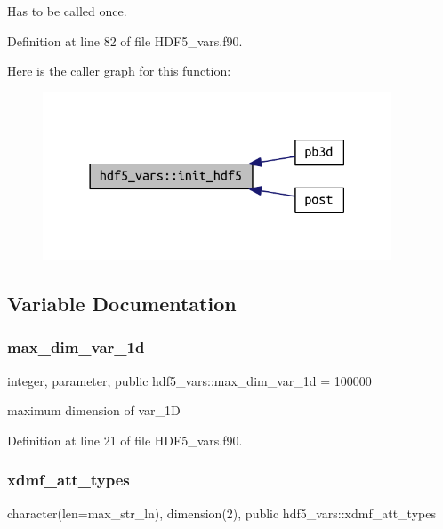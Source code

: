 Has to be called once. 

Definition at line 82 of file H\+D\+F5\+\_\+vars.\+f90.

Here is the caller graph for this function\+:\nopagebreak
\begin{figure}[H]
\begin{center}
\leavevmode
\includegraphics[width=294pt]{namespacehdf5__vars_ab644703bcb67ce423732e39ab56a4b63_icgraph}
\end{center}
\end{figure}


\subsection{Variable Documentation}
\mbox{\label{namespacehdf5__vars_a69c36b36ad7f55ff124ebc328d18adb7}} 
\subsubsection{\texorpdfstring{max\+\_\+dim\+\_\+var\+\_\+1d}{max\_dim\_var\_1d}}
{\footnotesize\ttfamily integer, parameter, public hdf5\+\_\+vars\+::max\+\_\+dim\+\_\+var\+\_\+1d = 100000}



maximum dimension of var\+\_\+1D 



Definition at line 21 of file H\+D\+F5\+\_\+vars.\+f90.

\mbox{\label{namespacehdf5__vars_a43c511f4b84cd716387c39c78b2cfe54}} 
\subsubsection{\texorpdfstring{xdmf\+\_\+att\+\_\+types}{xdmf\_att\_types}}
{\footnotesize\ttfamily character(len=max\+\_\+str\+\_\+ln), dimension(2), public hdf5\+\_\+vars\+::xdmf\+\_\+att\+\_\+types}



